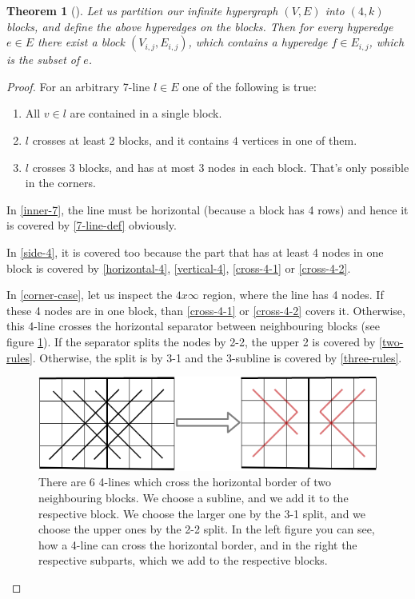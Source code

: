 \documentclass[conference]{IEEEtran}
\newtheorem{theorem}{Theorem}[section]
\theoremstyle{definition}
\begin{document}
\begin{theorem}[]
\label{thm:reduction_4k}
Let us partition our infinite hypergraph $(V,E)$ into $(4,k)$ blocks, and define the above hyperedges on the blocks.
Then for every hyperedge $e\in E$ there exist a block $(V_{i,j},E_{i,j})$, which contains a hyperedge $f\in E_{i,j}$, which is the subset of $e$. 
\end{theorem}

\begin{proof}
For an arbitrary 7-line $l \in E$ one of the following is true:
\begin{enumerate}[label=\textbf{C.\arabic*}]
    \item All $v \in l$ are contained in a single block. \label{inner-7}
    \item $l$ crosses at least 2 blocks,  and it contains $4$ vertices in one of them. \label{side-4}
    \item $l$ crosses 3 blocks, and has at most 3 nodes in each block. That's only possible in the corners. \label{corner-case}
\end{enumerate}

\noindent In \ref{inner-7}, the line must be horizontal (because a block has 4 rows) and hence it is covered by \ref{7-line-def} obviously.

\noindent In \ref{side-4}, it is covered too because the part that has at least 4 nodes in one block is covered by \ref{horizontal-4}, \ref{vertical-4}, \ref{cross-4-1} or \ref{cross-4-2}.

\noindent In \ref{corner-case}, let us inspect the $4x\infty$ region, where the line has 4 nodes. If these 4 nodes are in one block, than \ref{cross-4-1} or \ref{cross-4-2} covers it. Otherwise, this 4-line crosses the horizontal separator between neighbouring blocks (see figure \ref{fig:corner_lines}). If the separator splits the nodes by 2-2, the upper 2 is covered by \ref{two-rules}. Otherwise, the split is by 3-1 and the 3-subline is covered by \ref{three-rules}.

\begin{figure}
    \centering
    \includegraphics[scale=0.4]{figures/corner_lines.png}
    \caption{There are 6 4-lines which cross the horizontal border of two neighbouring blocks. We choose a subline, and we add it to the respective block. We choose the larger one by the 3-1 split, and we choose the upper ones by the 2-2 split. In the left figure you can see, how a 4-line can cross the horizontal border, and in the right the respective subparts, which we add to the respective blocks.}
    \label{fig:corner_lines}
\end{figure}
\end{proof}
\end{document}
